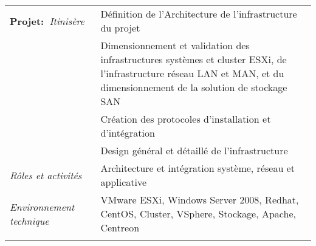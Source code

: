 \documentclass[a4paper,8pt]{article}
\begin{document}
\begin{tabular}{P{3.5cm}|p{13cm}}
\textbf{Projet:~}\textit{Itinisère}	& Définition de l’Architecture de l'infrastructure du projet\\
									& Dimensionnement et validation des infrastructures systèmes et cluster ESXi, de l'infrastructure réseau LAN et MAN, et du dimensionnement de la solution de stockage SAN\\
									& Création des protocoles d'installation et d'intégration\\
									& Design général et détaillé de l'infrastructure\\
\textsl{Rôles et activités}			& Architecture et intégration système, réseau et applicative\\
\textsl{Environnement technique}	& VMware ESXi, Windows Server 2008, Redhat, CentOS, Cluster, VSphere, Stockage, Apache, Centreon\\
 & \\
 

\end{tabular}
\end{document}
